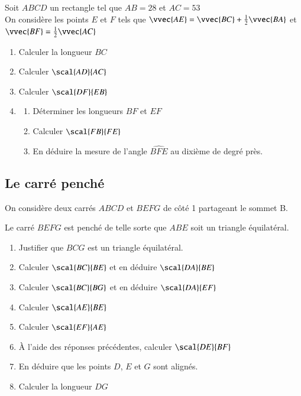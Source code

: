 \documentclass[oneside,12pt]{article}          %
\begin{document}
Soit $ABCD$ un rectangle tel que $AB=28$ et $AC=53$ \\
On considère les points $E$ et $F$ tels que $\vvec{AE}=\vvec{BC}+\frac{1}{2}\vvec{BA}$ et $\vvec{BF}=\frac{1}{2}\vvec{AC}$
\begin{enumerate}
	\item Calculer la longueur $BC$
    \item Calculer $\scal{AD}{AC}$
    \item Calculer $\scal{DF}{EB}$
    \item \begin{enumerate}
    	\item Déterminer les longueurs $BF$ et $EF$
    	\item Calculer $\scal{FB}{FE}$
    	\item En déduire la mesure de l'angle $\widehat{BFE}$ au dixième de degré près.
    \end{enumerate}
\end{enumerate}



\subsection{Le carré penché}

    On considère deux carrés $ABCD$ et $BEFG$ de côté 1 partageant le sommet B.

    Le carré $BEFG$ est penché de telle sorte que $ABE$ soit un triangle équilatéral.
    
\begin{minipage}{0.5\linewidth}
\begin{enumerate}
    \item Justifier que $BCG$ est un triangle équilatéral.
    \item Calculer $\scal{BC}{BE}$ et en déduire $\scal{DA}{BE}$
    \item Calculer $\scal{BC}{BG}$ et en déduire $\scal{DA}{EF}$
    \item Calculer $\scal{AE}{BE}$
    \item Calculer $\scal{EF}{AE}$
    \item À l'aide des réponses précédentes, calculer $\scal{DE}{BF}$
    \item En déduire que les points $D$, $E$ et $G$ sont alignés.
    \item[$\dur$] Calculer la longueur $DG$
\end{enumerate}
\end{minipage}
\hfill
\begin{minipage}{0.4\linewidth}
\end{minipage}
\end{document}
